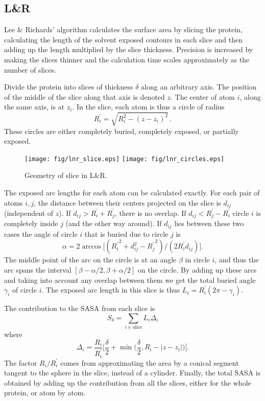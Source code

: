 \documentclass[a4paper,11pt]{article}
\begin{document}
\subsection{L\&R} \label{sec:alg_LnR}

Lee \& Richards' algorithm calculates the surface area by slicing the
protein, calculating the length of the solvent exposed contours in
each slice and then adding up the length multiplied by the slice
thickness. Precision is increased by making the slices thinner and the
calculation time scales approximately as the number of slices.

Divide the protein into slices of thickness $\delta$ along an
arbitrary axis. The position of the middle of the slice along that
axis is denoted $z$. The center of atom $i$, along the same axis, is
at $z_i$. In the slice, each atom is thus a circle of
radius $$R_i^\prime = \sqrt{R_i^2-(z-z_i)^2}\,.$$ These circles are
either completely buried, completely exposed, or partially exposed.
\begin{figure}
\texttt{[image: fig/lnr\_slice.eps]}
\texttt{[image: fig/lnr\_circles.eps]}
\caption{Geometry of slice in L\&R.\label{fig:slice}}

\end{figure}

The exposed arc lengths for each atom can be calculated exactly. For
each pair of atoms $i,j$, the distance between their centers projected
on the slice is $d_{ij}$ (independent of $z$). If $d_{ij} > R_i^\prime
+ R_j^\prime$, there is no overlap. If $d_{ij} < R_j^\prime -
R_i^\prime$ circle $i$ is completely inside $j$ (and the other way
around). If $d_{ij}$ lies between these two cases the angle of circle
$i$ that is buried due to circle $j$ is $$\alpha = 2\arccos
\bigl[({R_i^\prime}^2 + d_{ij}^2 - {R_{j}^\prime}^2)/(2R_i^\prime
  d_{ij})\bigr].$$ The middle point of the arc on the circle is at an
angle $\beta$ in circle $i$, and thus the arc spans the interval
$[\beta-\alpha/2,\beta+\alpha/2]$ on the circle. By adding up these
arcs and taking into account any overlap between them we get the total
buried angle $\gamma_i$ of circle $i$. The exposed arc length in this
slice is thus $L_i = R_i^\prime(2\pi-\gamma_i)$.

The contribution to the SASA from each slice is $$ S_\delta =
\sum_{i \in \text{slice}}L_i\Delta_i $$ where
$$
  \Delta_i = \frac{R_i}{R_i^\prime} \biggl[\frac{\delta}{2} 
    + \min\biggl(\frac{\delta}{2},R_i -
    \lvert z - z_i \rvert\biggr)\biggr]. 
$$ 
The factor $R_i/R_i^\prime$ comes from approximating the area by a
conical segment tangent to the sphere in the slice, instead of a
cylinder.  Finally, the total SASA is obtained by adding up the
contribution from all the slices, either for the whole protein, or
atom by atom.
\end{document}
